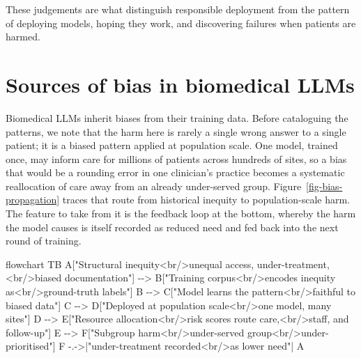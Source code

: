 \documentclass[
  letterpaper,
  11pt]{scrbook}
\newenvironment{Shaded}{\begin{snugshade}}{\end{snugshade}}
\newcommand{\NormalTok}[1]{\textcolor[rgb]{0.00,0.23,0.31}{#1}}
\begin{document}
These judgements are what distinguish responsible deployment from the
pattern of deploying models, hoping they work, and discovering failures
when patients are harmed.

\section{Sources of bias in biomedical
LLMs}\label{sources-of-bias-in-biomedical-llms}

Biomedical LLMs inherit biases from their training data. Before
cataloguing the patterns, we note that the harm here is rarely a single
wrong answer to a single patient; it is a biased pattern applied at
population scale. One model, trained once, may inform care for millions
of patients across hundreds of sites, so a bias that would be a rounding
error in one clinician's practice becomes a systematic reallocation of
care away from an already under-served group.
Figure~\ref{fig-bias-propagation} traces that route from historical
inequity to population-scale harm. The feature to take from it is the
feedback loop at the bottom, whereby the harm the model causes is itself
recorded as reduced need and fed back into the next round of training.

\begin{Shaded}
\begin{Highlighting}[]
\NormalTok{flowchart TB}
\NormalTok{  A["Structural inequity\textless{}br/\textgreater{}unequal access, under{-}treatment,\textless{}br/\textgreater{}biased documentation"] {-}{-}\textgreater{} B["Training corpus\textless{}br/\textgreater{}encodes inequity as\textless{}br/\textgreater{}ground{-}truth labels"]}
\NormalTok{  B {-}{-}\textgreater{} C["Model learns the pattern\textless{}br/\textgreater{}faithful to biased data"]}
\NormalTok{  C {-}{-}\textgreater{} D["Deployed at population scale\textless{}br/\textgreater{}one model, many sites"]}
\NormalTok{  D {-}{-}\textgreater{} E["Resource allocation\textless{}br/\textgreater{}risk scores route care,\textless{}br/\textgreater{}staff, and follow{-}up"]}
\NormalTok{  E {-}{-}\textgreater{} F["Subgroup harm\textless{}br/\textgreater{}under{-}served group\textless{}br/\textgreater{}under{-}prioritised"]}
\NormalTok{  F {-}.{-}\textgreater{}|"under{-}treatment recorded\textless{}br/\textgreater{}as lower need"| A}
\end{Highlighting}
\end{Shaded}
\end{document}
